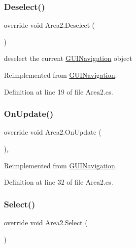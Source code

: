 \subsubsection{\texorpdfstring{Deselect()}{Deselect()}}
{\footnotesize\ttfamily override void Area2.\+Deselect (\begin{DoxyParamCaption}{ }\end{DoxyParamCaption})\hspace{0.3cm}{\ttfamily [virtual]}}



deselect the current \mbox{\hyperlink{class_g_u_i_navigation}{G\+U\+I\+Navigation}} object 



Reimplemented from \mbox{\hyperlink{class_g_u_i_navigation_a98563f06446b45814ff78978b472e948}{G\+U\+I\+Navigation}}.



Definition at line 19 of file Area2.\+cs.

\mbox{\label{class_area2_ac85063b5dbded942092c9e3df2a8bf29}} 
\subsubsection{\texorpdfstring{On\+Update()}{OnUpdate()}}
{\footnotesize\ttfamily override void Area2.\+On\+Update (\begin{DoxyParamCaption}{ }\end{DoxyParamCaption})\hspace{0.3cm}{\ttfamily [protected]}, {\ttfamily [virtual]}}



Reimplemented from \mbox{\hyperlink{class_g_u_i_navigation_aad668226e400889bceea3914750b949e}{G\+U\+I\+Navigation}}.



Definition at line 32 of file Area2.\+cs.

\mbox{\label{class_area2_a099229de36fc80039e1f8ea8d3dca78b}} 
\subsubsection{\texorpdfstring{Select()}{Select()}}
{\footnotesize\ttfamily override void Area2.\+Select (\begin{DoxyParamCaption}{ }\end{DoxyParamCaption})\hspace{0.3cm}{\ttfamily [virtual]}}



